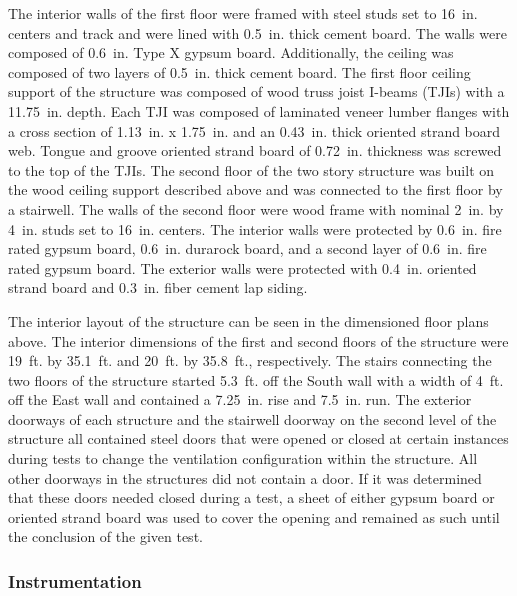 \documentclass{article}
\begin{document}
\clearpage

The interior walls of the first floor were framed with steel studs set to 16~in. centers and track and were lined with 0.5~in. thick cement board. The walls were composed of 0.6~in. Type X gypsum board. Additionally, the ceiling was composed of two layers of 0.5~in. thick cement board. The first floor ceiling support of the structure was composed of wood truss joist I-beams (TJIs) with a 11.75~in. depth. Each TJI was composed of laminated veneer lumber flanges with a cross section of 1.13~in. x 1.75~in. and an 0.43~in. thick oriented strand board web. Tongue and groove oriented strand board of 0.72~in. thickness was screwed to the top of the TJIs. The second floor of the two story structure was built on the wood ceiling support described above and was connected to the first floor by a stairwell. The walls of the second floor were wood frame with nominal 2~in. by 4~in. studs set to 16~in. centers. The interior walls were protected by 0.6~in. fire rated gypsum board, 0.6~in. durarock board, and a second layer of 0.6~in. fire rated gypsum board. The exterior walls were protected with 0.4~in. oriented strand board and 0.3~in. fiber cement lap siding.

The interior layout of the structure can be seen in the dimensioned floor plans above. The interior dimensions of the first and second floors of the structure were 19~ft. by 35.1~ft. and 20~ft. by 35.8~ft., respectively. The stairs connecting the two floors of the structure started 5.3~ft. off the South wall with a width of 4~ft. off the East wall and contained a 7.25~in. rise and 7.5~in. run. The exterior doorways of each structure and the stairwell doorway on the second level of the structure all contained steel doors that were opened or closed at certain instances during tests to change the ventilation configuration within the structure. All other doorways in the structures did not contain a door. If it was determined that these doors needed closed during a test, a sheet of either gypsum board or oriented strand board was used to cover the opening and remained as such until the conclusion of the given test.

\subsubsection{Instrumentation}

\end{document}
